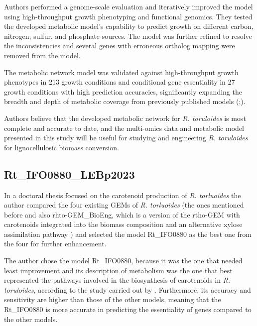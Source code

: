 Authors performed a genome-scale evaluation and iteratively
improved the model using high-throughput growth phenotyping
and functional genomics. They tested the developed metabolic model's capability to predict
growth on different carbon, nitrogen, sulfur, and phosphate
sources. The model was further refined to resolve the inconsistencies and several genes
with erroneous ortholog mapping were removed from the
model. \cite{Kim2021}

The metabolic network model was validated against high-throughput growth phenotypes in 213 growth conditions and
conditional gene essentiality in 27 growth conditions with high
prediction accuracies, significantly expanding the breadth and
depth of metabolic coverage from previously published models
(\cite{Dinh2019};\cite{Tiukova2019}). \cite{Kim2021}

Authors believe that the
developed metabolic network for \textit{R. toruloides} is most complete
and accurate to date, and the multi-omics data and metabolic
model presented in this study will be useful for studying and
engineering \textit{R. toruloides} for lignocellulosic biomass conversion. \cite{Kim2021}


\subsection{Rt\_IFO0880\_LEBp2023}

 In a doctoral thesis focused on the carotenoid production of \textit{R. torluoides} \cite{DeBiaggi2023} the author compared the four existing GEMs 
 of \textit{R. torluoides} (the ones mentioned before and also rhto-GEM\_BioEng, 
 which is a version of the rtho-GEM with carotenoids integrated into the biomass composition and an alternative xylose assimilation pathway \cite{Pinheiro2020}) and selected the model 
 Rt\_IFO0880 as the best one from the four for further enhancement.

 The author chose the model Rt\_IFO0880, because it was the one
 that needed least improvement and its description of 
 metabolism was the one that best represented the pathways involved in the 
 biosynthesis of carotenoids in \textit{R. toruloides}, according to the study carried out by \cite{DeBiaggi2023}. 
Furthermore, its accuracy and sensitivity are higher than those of the other models, meaning that the Rt\_IFO0880 is more accurate in predicting 
the essentiality of genes compared to the other models. \cite{DeBiaggi2023}

